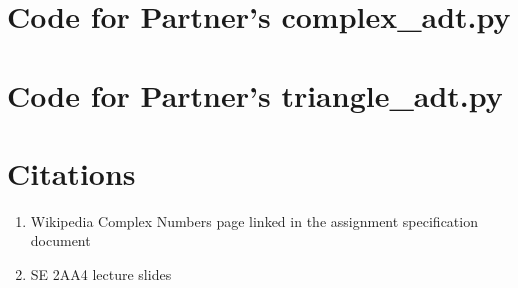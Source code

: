 \documentclass[12pt]{article}
\begin{document}
\noindent 

\newpage

\section{Code for Partner's complex\_adt.py}

\noindent 

\section{Code for Partner's triangle\_adt.py}

\noindent 

\newpage

\section{Citations}

\begin{enumerate}

\item Wikipedia Complex Numbers page linked in the assignment specification document
\item SE 2AA4 lecture slides

\end{enumerate}
\end{document}
